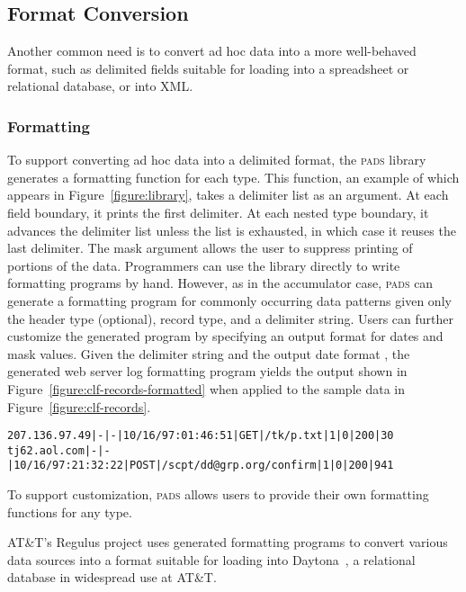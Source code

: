\documentclass{sigplanconf}
\newcommand{\darkstar}{Regulus}
\newcommand{\figref}[1]{Figure~\ref{#1}}
\newcommand{\pads}{\textsc{pads}}
\begin{document}
\subsection{Format Conversion}
Another common need is to convert ad hoc data into a more well-behaved format, such as delimited fields suitable for loading into a spreadsheet or relational database, or into XML.  
\subsubsection{Formatting}
To support converting ad hoc data into a delimited format, the \pads{}
library generates a formatting function for each type.  This function,
an example of which appears in \figref{figure:library}, takes a delimiter
list as an argument.  At each field boundary, it prints the first delimiter.
At each nested type boundary, it advances the delimiter list unless the list
is exhausted, in which case it reuses the last delimiter.  The mask argument
allows the user to suppress printing of portions of the data.  Programmers
can use the library directly to write formatting programs by hand.  However, 
as in the accumulator case, \pads{} can generate a formatting program for 
commonly occurring data patterns given only the header type (optional), record type, and a delimiter string.  Users can further customize the generated program by specifying an output format for dates and mask values.   Given the delimiter
string  and the output date format , the generated
web server log formatting program yields
the output shown in \figref{figure:clf-records-formatted} when applied to the
sample data in \figref{figure:clf-records}. 
\begin{figure*}
\begin{small}
\begin{center}
\begin{verbatim}
207.136.97.49|-|-|10/16/97:01:46:51|GET|/tk/p.txt|1|0|200|30
tj62.aol.com|-|-|10/16/97:21:32:22|POST|/scpt/dd@grp.org/confirm|1|0|200|941
\end{verbatim}
\caption{Formatted CLF records.}
\label{figure:clf-records-formatted}
\end{center}
\end{small}
\end{figure*}
To support customization, \pads{} allows users to provide their own formatting functions for any type.

AT\&T's \darkstar{} project uses generated formatting programs to convert
various data sources into a format suitable for loading into Daytona~\cite{daytona},
a relational database in widespread use at AT\&T.
\end{document}
